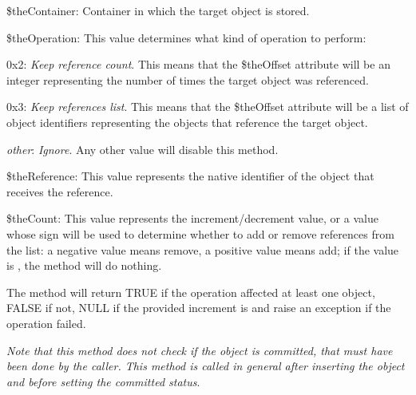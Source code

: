 \begin{DoxyItemize}
\item {\ttfamily \$the\-Container}\-: Container in which the target object is stored. 
\item {\ttfamily \$the\-Operation}\-: This value determines what kind of operation to perform\-: 
\begin{DoxyItemize}
\item {\ttfamily 0x2}\-: {\itshape Keep reference count}. This means that the {\ttfamily \$the\-Offset} attribute will be an integer representing the number of times the target object was referenced. 
\item {\ttfamily 0x3}\-: {\itshape Keep references list}. This means that the {\ttfamily \$the\-Offset} attribute will be a list of object identifiers representing the objects that reference the target object. 
\item {\itshape other}\-: {\itshape Ignore}. Any other value will disable this method. 
\end{DoxyItemize}
\item {\ttfamily \$the\-Reference}\-: This value represents the native identifier of the object that receives the reference. 
\item {\ttfamily \$the\-Count}\-: This value represents the increment/decrement value, or a value whose sign will be used to determine whether to add or remove references from the list\-: a negative value means remove, a positive value means add; if the value is {}, the method will do nothing. 
\end{DoxyItemize}

The method will return {\ttfamily T\-R\-U\-E} if the operation affected at least one object, {\ttfamily F\-A\-L\-S\-E} if not, {\ttfamily N\-U\-L\-L} if the provided increment is {} and raise an exception if the operation failed.

{\itshape Note that this method does not check if the object is committed, that must have been done by the caller. This method is called in general after inserting the object and before setting the committed status}.


